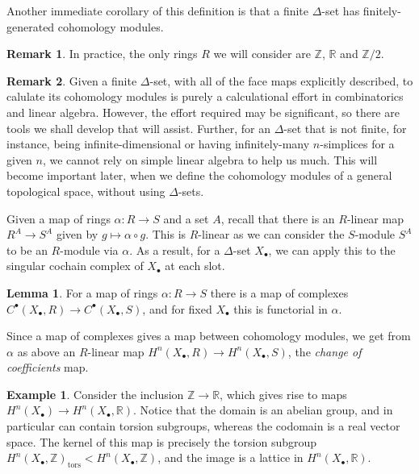 \documentclass{tufte-handout}
\def\RR{\mathbb{R}}
\def\ZZ{\mathbb{Z}}
\theoremstyle{definition}
\newtheorem{lemma}{Lemma}
\newtheorem{example}{Example}
\newtheorem*{rem}{Remark}
\begin{document}
Another immediate corollary of this definition is that a finite $\Delta$-set has finitely-generated
cohomology modules.

\begin{rem}
In practice, the only rings $R$ we will consider are $\ZZ$, $\RR$ and $\ZZ/2$.
\end{rem}

\begin{rem}
Given a finite $\Delta$-set, with all of the face maps explicitly described, to calulate
its cohomology modules is purely a calculational effort in combinatorics and linear algebra.
However, the effort required may be significant, so there are tools we shall develop that will
assist. Further, for an $\Delta$-set that is not finite, for instance, being 
infinite-dimensional or having infinitely-many $n$-simplices for a given $n$, we cannot rely 
on simple linear algebra to help us much. This will become important later, when we define
the cohomology modules of a general topological space, without using $\Delta$-sets.
\end{rem}

Given a map of rings $\alpha\colon R\to S$ and a set $A$, recall that there is an $R$-linear map 
$R^A\to S^A$ given by $g\mapsto \alpha\circ g$. This is $R$-linear as we can consider
the $S$-module $S^A$ to be an $R$-module via $\alpha$.
As a result, for a $\Delta$-set $X_\bullet$, we can apply this to the singular cochain complex 
of $X_\bullet$ at each slot.

\begin{lemma}
For a map of rings $\alpha\colon R\to S$ there is a map of complexes 
$C^\bullet(X_\bullet,R)\to C^\bullet(X_\bullet,S)$, and for fixed $X_\bullet$ this is functorial
in $\alpha$.
\end{lemma}

Since a map of complexes gives a map between cohomology modules, we get from $\alpha$ as above
an $R$-linear map $H^n(X_\bullet,R) \to H^n(X_\bullet,S)$, the \emph{change of coefficients} map.

\begin{example}
Consider the inclusion $\ZZ\to\RR$, which gives rise to maps 
$H^n(X_\bullet) \to H^n(X_\bullet,\RR)$. Notice that the domain is an abelian group, and in particular
can contain torsion subgroups, whereas the codomain is a real vector space. The kernel of this
map is precisely the torsion subgroup $H^n(X_\bullet,\ZZ)_\mathrm{tors} < H^n(X_\bullet,\ZZ)$, and the image is a lattice in
$H^n(X_\bullet,\RR)$.
\end{example}
\end{document}
